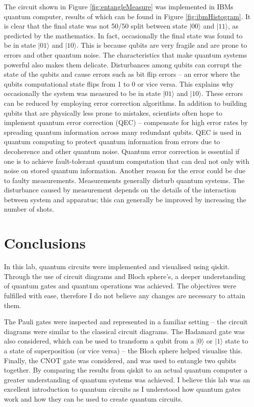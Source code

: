 The circuit shown in Figure \ref{fig:entangleMeasure} was implemented in IBMs quantum computer, results of which can be found in Figure \ref{fig:ibmHistogram}. It is clear that the final state was not 50/50 split between state $|00\rangle$ and $|11\rangle$, as predicted by the mathematics. In fact, occasionally the final state was found to be in state $|01\rangle$ and $|10\rangle$. This is because qubits are very fragile and are prone to errors and other quantum noise. The characteristics that make quantum systems powerful also makes them delicate. Disturbances among qubits can corrupt the state of the qubits and cause errors such as bit flip errors -- an error where the qubits computational state flips from 1 to 0 or vice versa. This explains why occasionally the system was measured to be in state $|01\rangle$ and $|10\rangle$. These errors can be reduced by employing error correction algorithms. In addition to building qubits that are physically less prone to mistakes, scientists often hope to implement quantum error correction (QEC) -- compensate for high error rates by spreading quantum information across many redundant qubits. QEC is used in quantum computing to protect quantum information from errors due to decoherence and other quantum noise. Quantum error correction is essential if one is to achieve fault-tolerant quantum computation that can deal not only with noise on stored quantum information. Another reason for the error could be due to faulty measurements. Measurements generally disturb quantum systems. The disturbance caused by measurement depends on the details of the interaction between system and apparatus; this can generally be improved by increasing the number of shots.

\section{Conclusions}

In this lab, quantum circuits were implemented and visualised using qiskit. Through the use of circuit diagrams and Bloch sphere's, a deeper understanding of quantum gates and quantum operations was achieved. The objectives were fulfilled with ease, therefore I do not believe any changes are necessary to attain them.

The Pauli gates were inspected and represented in a familiar setting -- the circuit diagrams were similar to the classical circuit diagrams. The Hadamard gate was also considered, which can be used to transform a qubit from a $|0\rangle$ or $|1\rangle$ state to a state of superposition (or vice versa) -- the Bloch sphere helped visualise this. Finally, the CNOT gate was considered, and was used to entangle two qubits together. By comparing the results from qiskit to an actual quantum computer a greater understanding of quantum systems was achieved. I believe this lab was an excellent introduction to quantum circuits as I understood how quantum gates work and how they can be used to create quantum circuits.